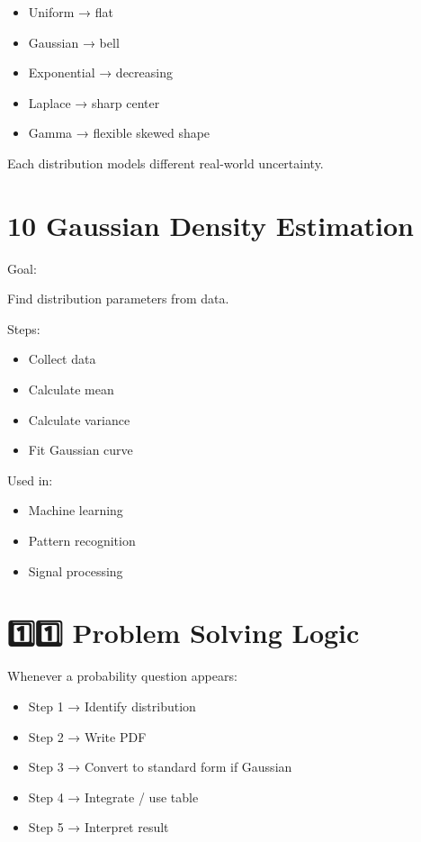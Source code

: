 \documentclass[12pt,a4paper]{article}
\begin{document}
\begin{itemize}
\item Uniform → flat
\item Gaussian → bell
\item Exponential → decreasing
\item Laplace → sharp center
\item Gamma → flexible skewed shape
\end{itemize}

Each distribution models different real-world uncertainty.

\section*{10 Gaussian Density Estimation}

Goal:

Find distribution parameters from data.

Steps:

\begin{itemize}
\item Collect data
\item Calculate mean
\item Calculate variance
\item Fit Gaussian curve
\end{itemize}

Used in:

\begin{itemize}
\item Machine learning
\item Pattern recognition
\item Signal processing
\end{itemize}

\section*{1️⃣1️⃣ Problem Solving Logic}

Whenever a probability question appears:

\begin{itemize}
\item Step 1 → Identify distribution
\item Step 2 → Write PDF
\item Step 3 → Convert to standard form if Gaussian
\item Step 4 → Integrate / use table
\item Step 5 → Interpret result
\end{itemize}
\end{document}
